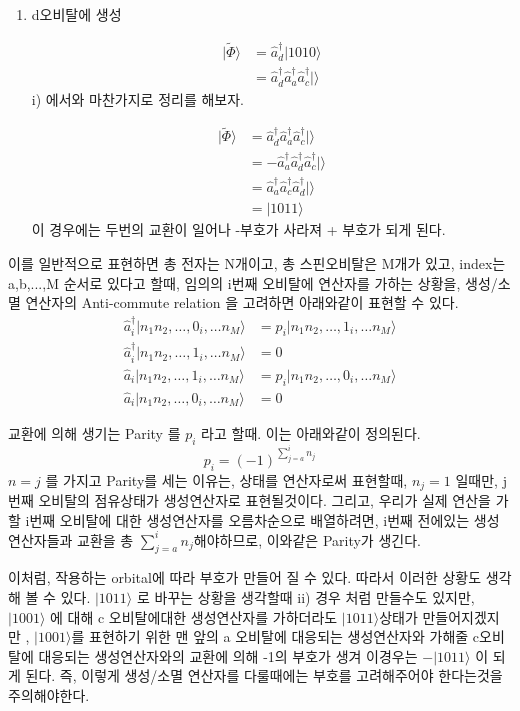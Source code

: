 \documentclass[10pt]{article}
\begin{document}
\begin{enumerate}[label=\(\mathrm{ii}\))]
\item {d오비탈에 생성}

\begin{align*}
| \tilde{\Phi }\rangle & = \hat{a}_d^{\dagger}\vert 1010 \rangle \\
& = \hat{a}_d^{\dagger}\hat{a}_a^{\dagger}\hat{a}_c^{\dagger} \vert \rangle 
\end{align*}
i) 에서와 마찬가지로 정리를 해보자. 

\begin{align*}
| \tilde{\Phi }\rangle & = \hat{a}_d^{\dagger}\hat{a}_a^{\dagger}\hat{a}_c^{\dagger} \vert\rangle \\
& = -\hat{a}_a^{\dagger}\hat{a}_d^{\dagger}\hat{a}_c^{\dagger} \vert \rangle \\
& = \hat{a}_a^{\dagger}\hat{a}_c^{\dagger}\hat{a}_d^{\dagger} \vert \rangle  \\
& = \vert 1011 \rangle
\end{align*}
이 경우에는 두번의 교환이 일어나 -부호가 사라져 + 부호가 되게 된다. 
\end{enumerate}
이를 일반적으로 표현하면 총 전자는 N개이고, 총 스핀오비탈은 M개가 있고, index는 a,b,...,M 순서로 있다고 할때, 임의의 i번째 오비탈에 연산자를 가하는 상황을, 
생성/소멸 연산자의 Anti-commute relation 을 고려하면 아래와같이 표현할 수 있다.
\begin{align*}
\hat{a}_i^{\dagger}\vert n_1 n_2 ,\dots, 0_i ,\dots n_M \rangle &= p_i \vert n_1 n_2 ,\dots, 1_i ,\dots n_M \rangle \\
\hat{a}_i^{\dagger}\vert n_1 n_2 ,\dots, 1_i ,\dots n_M \rangle &= 0 \\
\hat{a}_i\vert n_1 n_2 ,\dots, 1_i ,\dots n_M \rangle &= p_i \vert n_1 n_2 ,\dots, 0_i ,\dots n_M \rangle \\
\hat{a}_i\vert n_1 n_2 ,\dots, 0_i ,\dots n_M \rangle &= 0
\end{align*}

교환에 의해 생기는 Parity 를 \(p_i\) 라고 할때. 이는 아래와같이 정의된다. 
\[p_i = (-1)^{\sum_{j=a}^{i}n_j}\]
\(n=j\) 를 가지고 Parity를 세는 이유는, 상태를 연산자로써 표현할때, \(n_j=1\) 일때만, j번째 오비탈의 점유상태가 생성연산자로 표현될것이다. 
그리고, 우리가 실제 연산을 가할 i번째 오비탈에 대한 생성연산자를 오름차순으로 배열하려면, i번째 전에있는 생성연산자들과 교환을 총 \(\sum_{j=a}^{i}n_j\)해야하므로, 이와같은 Parity가 생긴다. 

이처럼, 작용하는 orbital에 따라 부호가 만들어 질 수 있다. 따라서 이러한 상황도 생각해 볼 수 있다.  \(\vert 1011 \rangle\) 로 바꾸는 상황을 생각할때 ii) 경우 처럼 만들수도 있지만, 
\(\vert 1001 \rangle\) 에 대해 c 오비탈에대한 생성연산자를 가하더라도 \(\vert 1011 \rangle\)상태가 만들어지겠지만 , \(\vert 1001 \rangle\)를 표현하기 위한 맨 앞의 a 오비탈에 대응되는 생성연산자와 
가해줄 c오비탈에 대응되는 생성연산자와의 교환에 의해 -1의 부호가 생겨 이경우는 \(-\vert 1011 \rangle\) 이 되게 된다. 
즉, 이렇게 생성/소멸 연산자를 다룰때에는 부호를 고려해주어야 한다는것을 주의해야한다. 
\end{document}

